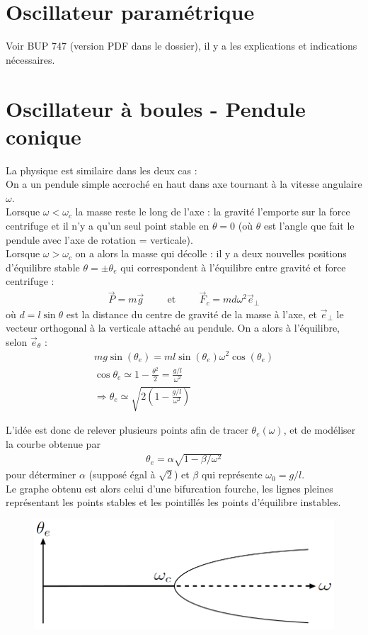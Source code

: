 \documentclass[12pt,prb,aps,epsf]{article}
\begin{document}
\section{Oscillateur paramétrique}
Voir BUP 747 (version PDF dans le dossier), il y a les explications et indications nécessaires.

\section{Oscillateur à boules - Pendule conique}

La physique est similaire dans les deux cas :\\
On a un pendule simple accroché en haut dans axe tournant à la vitesse angulaire $\omega$.\\

 Lorsque $\omega < \omega_c$ la masse reste le long de l'axe : la gravité l'emporte sur la force centrifuge et il n'y a qu'un seul point stable en $\theta =0$ (où $\theta$ est l'angle que fait le pendule avec l'axe de rotation = verticale). \\
 
 Lorsque $\omega > \omega_c$ on a alors la masse qui décolle : il y a deux nouvelles positions d'équilibre stable $\theta = \pm\theta_e$ qui correspondent à l'équilibre entre gravité et force centrifuge : 
 \begin{eqnarray}
 \vec{P} = m\vec{g}\hspace{1cm}\mathrm{et}\hspace{1cm}\vec{F}_c = md\omega^2\vec{e}_{\perp}
 \end{eqnarray}
où $d = l\sin{\theta}$ est la distance du centre de gravité de la masse à l'axe, et $\vec{e}_{\perp}$ le vecteur orthogonal à la verticale attaché au pendule. On a alors à l'équilibre, selon $\vec{e}_{\theta}$ :
\begin{eqnarray}
mg\sin(\theta_e) = ml\sin(\theta_e)\omega^2\cos(\theta_e)\\
\cos\theta_e \simeq 1 - \frac{\theta^2}{2} = \frac{g/l}{\omega^2}\\
\Longrightarrow \theta_e \simeq \sqrt{2\left(1-\frac{g/l}{\omega^2}\right) }
\end{eqnarray} 

L'idée est donc de relever plusieurs points afin de tracer $\theta_e(\omega)$, et de modéliser la courbe obtenue par 
\begin{eqnarray}
\theta_e = \alpha\sqrt{1-\beta/\omega^2}
\end{eqnarray}
pour déterminer $\alpha$ (supposé égal à $\sqrt{2}$) et $\beta$ qui représente $\omega_0= g/l$.\\

Le graphe obtenu est alors celui d'une bifurcation fourche, les lignes pleines représentant les points stables et les pointillés les points d'équilibre instables.
\begin{figure}[h]
	\centerline{\includegraphics[width=15cm]{fourche}}
\end{figure}
\end{document}
